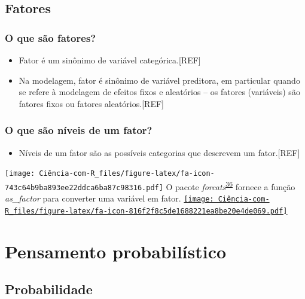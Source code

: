 \documentclass[
]{book}
\providecommand{\tightlist}{%
  \setlength{\itemsep}{0pt}\setlength{\parskip}{0pt}}
\begin{document}
\hypertarget{fatores}{%
\section{Fatores}\label{fatores}}

\hypertarget{o-que-suxe3o-fatores}{%
\subsection{O que são fatores?}\label{o-que-suxe3o-fatores}}

\begin{itemize}
\item
  Fator é um sinônimo de variável categórica.{[}REF{]}
\item
  Na modelagem, fator é sinônimo de variável preditora, em particular quando se refere à modelagem de efeitos fixos e aleatórios -- os fatores (variáveis) são fatores fixos ou fatores aleatórios.{[}REF{]}
\end{itemize}

\hypertarget{o-que-suxe3o-nuxedveis-de-um-fator}{%
\subsection{O que são níveis de um fator?}\label{o-que-suxe3o-nuxedveis-de-um-fator}}

\begin{itemize}
\tightlist
\item
  Níveis de um fator são as possíveis categorias que descrevem um fator.{[}REF{]}
\end{itemize}

\texttt{[image: Ciência-com-R\_files/figure-latex/fa-icon-743c64b9ba893ee22ddca6ba87c98316.pdf]} O pacote \emph{forcats}\textsuperscript{\protect\hyperlink{ref-forcats}{36}} fornece a função \emph{as\_factor} para converter uma variável em fator. \href{https://cran.r-project.org/web/packages/forcats/index.html}{\texttt{[image: Ciência-com-R\_files/figure-latex/fa-icon-816f2f8c5de1688221ea8be20e4de069.pdf]}}

\hypertarget{pensamento-probabilistico}{%
\chapter{\texorpdfstring{\textbf{Pensamento probabilístico}}{Pensamento probabilístico}}\label{pensamento-probabilistico}}

\hypertarget{probabilidade}{%
\section{Probabilidade}\label{probabilidade}}
\end{document}
